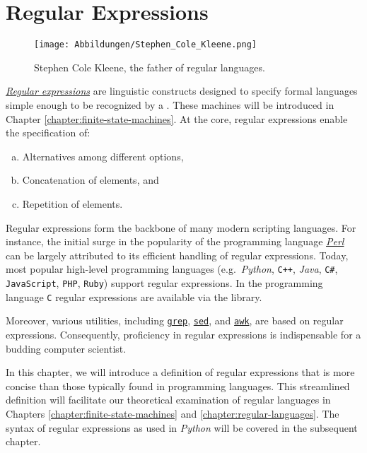
\chapter{Regular Expressions \label{chapter:regular-expressions}}

\begin{figure}[h]  %
\centering
  \texttt{[image: Abbildungen/Stephen\_Cole\_Kleene.png]}
\caption{Stephen Cole Kleene, the father of regular languages.}
\label{fig:chapter-image}
\end{figure}

\href{http://en.wikipedia.org/wiki/Regular_expression}{\emph{Regular expressions}} 
are linguistic constructs designed to specify formal languages simple enough to be recognized by a
.  These machines will be introduced in Chapter \ref{chapter:finite-state-machines}.
At the core, regular expressions enable the specification of:  
\begin{enumerate}[(a)]
\item Alternatives among different options,
\item Concatenation of elements, and
\item Repetition of elements.
\end{enumerate}

Regular expressions form the backbone of many modern scripting languages. For instance, the initial surge in
the popularity of the programming language \href{http://en.wikipedia.org/wiki/Perl}{\textsl{Perl}} can be
largely attributed to its efficient handling of regular expressions. Today,  most popular high-level
programming languages (e.g.~\textsl{Python}, \texttt{C++}, \textsl{Java}, \texttt{C\#}, \texttt{JavaScript},
\texttt{PHP}, \texttt{Ruby}) support regular expressions.  In the programming language \texttt{C} regular
expressions are available via the  library.  

Moreover, various  utilities, including \href{http://en.wikipedia.org/wiki/Grep}{\texttt{grep}},
\href{http://en.wikipedia.org/wiki/Sed}{\texttt{sed}}, and
\href{http://en.wikipedia.org/wiki/Awk}{\texttt{awk}}, are based on regular
expressions. Consequently, proficiency in regular expressions is indispensable for a budding computer scientist.

In this chapter, we will introduce a definition of regular expressions that is more concise than those typically found in programming languages. This streamlined definition will facilitate our theoretical examination of regular languages in Chapters \ref{chapter:finite-state-machines} and \ref{chapter:regular-languages}. The syntax of regular expressions as used in \textsl{Python} will be covered in the subsequent chapter.

